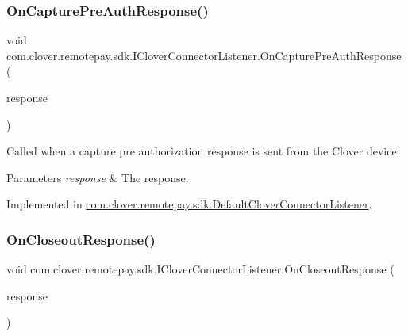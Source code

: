 \subsubsection{\texorpdfstring{On\+Capture\+Pre\+Auth\+Response()}{OnCapturePreAuthResponse()}}
{\footnotesize\ttfamily void com.\+clover.\+remotepay.\+sdk.\+I\+Clover\+Connector\+Listener.\+On\+Capture\+Pre\+Auth\+Response (\begin{DoxyParamCaption}\item[{\hyperlink{classcom_1_1clover_1_1remotepay_1_1sdk_1_1_capture_pre_auth_response}{Capture\+Pre\+Auth\+Response}}]{response }\end{DoxyParamCaption})}



Called when a capture pre authorization response is sent from the Clover device. 


\begin{DoxyParams}{Parameters}
{\em response} & The response.\\
\hline
\end{DoxyParams}


Implemented in \hyperlink{classcom_1_1clover_1_1remotepay_1_1sdk_1_1_default_clover_connector_listener_a8b16a6574748f4ae7852d710c169a86e}{com.\+clover.\+remotepay.\+sdk.\+Default\+Clover\+Connector\+Listener}.

\mbox{\label{interfacecom_1_1clover_1_1remotepay_1_1sdk_1_1_i_clover_connector_listener_a8558c8169f271fa5b26994be50464fb6}} 
\subsubsection{\texorpdfstring{On\+Closeout\+Response()}{OnCloseoutResponse()}}
{\footnotesize\ttfamily void com.\+clover.\+remotepay.\+sdk.\+I\+Clover\+Connector\+Listener.\+On\+Closeout\+Response (\begin{DoxyParamCaption}\item[{\hyperlink{classcom_1_1clover_1_1remotepay_1_1sdk_1_1_closeout_response}{Closeout\+Response}}]{response }\end{DoxyParamCaption})}



